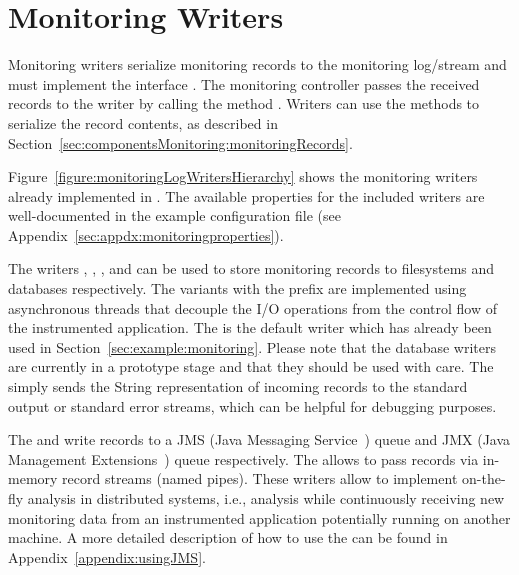 \section{Monitoring Writers}\label{sec:monitoring-log-writers}

Monitoring writers serialize monitoring records to the monitoring log/stream and  %
must implement the interface . The monitoring %
controller passes the received records to the writer by calling the method %
. Writers can use the methods to serialize the %
record contents, as described in Section~\ref{sec:componentsMonitoring:monitoringRecords}.

Figure~\ref{figure:monitoringLogWritersHierarchy} shows the monitoring writers %
already implemented in \KiekerMonitoringPart{}. The available properties for the %
included writers are well-documented in the %
example configuration file (see Appendix~\ref{sec:appdx:monitoringproperties}). %

\enlargethispage{1.2cm}

The writers , %
, , and  can be used %
to store monitoring records to filesystems and databases respectively. %
The variants with the prefix  are implemented using asynchronous %
threads that decouple the I/O operations from the control flow of the %
instrumented application. %
The  is the default writer which has already been used in %
Section~\ref{sec:example:monitoring}. %
Please note that the database writers are currently in a prototype stage and
that they should be used with care. %
The  simply sends the String representation of incoming %
records to the standard output or standard error streams, which can be helpful %
for debugging purposes.

The  and  write records to a JMS %
(Java Messaging Service~\cite{JMS-WebSite}) queue and JMX (Java Management %
Extensions~\cite{JMX-Website}) queue respectively. The  %
allows to pass records via in-memory record streams (named pipes). %
These writers allow to implement on-the-fly analysis in distributed systems, i.e., analysis while %
continuously receiving new monitoring data from an instrumented application potentially %
running on another machine. A more detailed description of how to use the  %
can be found in Appendix~\ref{appendix:usingJMS}. %

